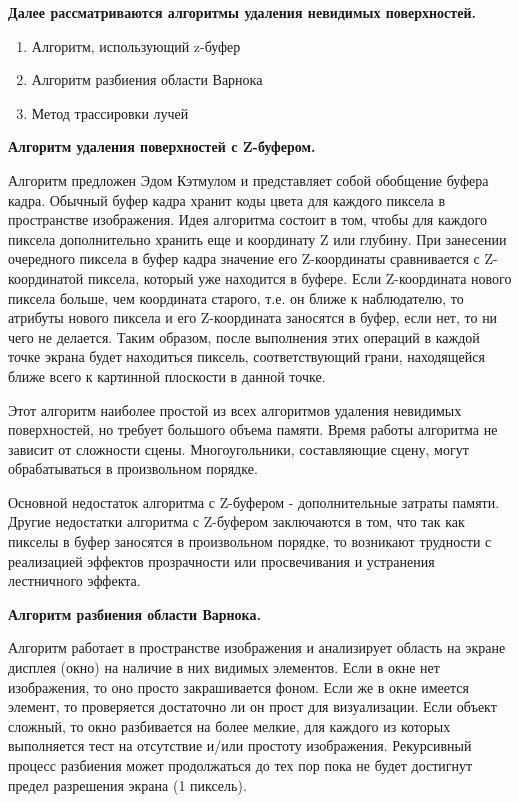 \textbf{Далее рассматриваются алгоритмы удаления невидимых поверхностей. } \cite{deletenovisible}

\begin{enumerate}
	\item Алгоритм, использующий z-буфер
	\item Алгоритм разбиения области Варнока
	\item Метод трассировки лучей
\end{enumerate}

\textbf{Алгоритм удаления поверхностей с Z-буфером. }

Алгоритм предложен Эдом Кэтмулом и представляет собой обобщение буфера кадра. Обычный буфер кадра хранит коды цвета для каждого пиксела в пространстве изображения. Идея алгоритма состоит в том, чтобы для каждого пиксела дополнительно хранить еще и координату Z или глубину. При занесении очередного пиксела в буфер кадра значение его Z-координаты сравнивается с Z-координатой пиксела, который уже находится в буфере. Если Z-координата нового пиксела больше, чем координата старого, т.е. он ближе к наблюдателю, то атрибуты нового пиксела и его Z-координата заносятся в буфер, если нет, то ни чего не делается. Таким образом, после выполнения этих операций в каждой точке экрана будет находиться пиксель, соответствующий грани, находящейся ближе всего к картинной плоскости в данной точке.

Этот алгоритм наиболее простой из всех алгоритмов удаления невидимых поверхностей, но требует большого объема памяти. Время работы алгоритма не зависит от сложности сцены. Многоугольники, составляющие сцену, могут обрабатываться в произвольном порядке. 

Основной недостаток алгоритма с Z-буфером - дополнительные затраты памяти. Другие недостатки алгоритма с Z-буфером заключаются в том, что так как пикселы в буфер заносятся в произвольном порядке, то возникают трудности с реализацией эффектов прозрачности или просвечивания и устранения лестничного эффекта. 

\textbf{Алгоритм разбиения области Варнока. }

Алгоритм работает в пространстве изображения и анализирует область на экране дисплея (окно) на наличие в них видимых элементов. Если в окне нет изображения, то оно просто закрашивается фоном. Если же в окне имеется элемент, то проверяется достаточно ли он прост для визуализации. Если объект сложный, то окно разбивается на более мелкие, для каждого из которых выполняется тест на отсутствие и/или простоту изображения. Рекурсивный процесс разбиения может продолжаться до тех пор пока не будет достигнут предел разрешения экрана (1 пиксель).

